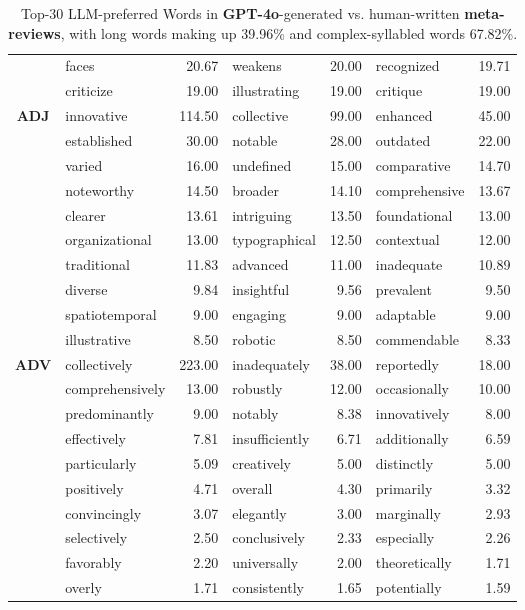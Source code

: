 \begin{table*}[t]
{\begin{tabular}{@{}c|lrlrlr@{}}
            & faces & 20.67 & weakens & 20.00 & recognized & 19.71 \\
            & criticize & 19.00 & illustrating & 19.00 & critique & 19.00 \\
            \midrule
            \multirow{10}{*}{\textbf{ADJ}} 
            & innovative & 114.50 & collective & 99.00 & enhanced & 45.00 \\
            & established & 30.00 & notable & 28.00 & outdated & 22.00 \\
            & varied & 16.00 & undefined & 15.00 & comparative & 14.70 \\
            & noteworthy & 14.50 & broader & 14.10 & comprehensive & 13.67 \\
            & clearer & 13.61 & intriguing & 13.50 & foundational & 13.00 \\
            & organizational & 13.00 & typographical & 12.50 & contextual & 12.00 \\
            & traditional & 11.83 & advanced & 11.00 & inadequate & 10.89 \\
            & diverse & 9.84 & insightful & 9.56 & prevalent & 9.50 \\
            & spatiotemporal & 9.00 & engaging & 9.00 & adaptable & 9.00 \\
            & illustrative & 8.50 & robotic & 8.50 & commendable & 8.33 \\
            \midrule
            \multirow{10}{*}{\textbf{ADV}} 
            & collectively & 223.00 & inadequately & 38.00 & reportedly & 18.00 \\
            & comprehensively & 13.00 & robustly & 12.00 & occasionally & 10.00 \\
            & predominantly & 9.00 & notably & 8.38 & innovatively & 8.00 \\
            & effectively & 7.81 & insufficiently & 6.71 & additionally & 6.59 \\
            & particularly & 5.09 & creatively & 5.00 & distinctly & 5.00 \\
            & positively & 4.71 & overall & 4.30 & primarily & 3.32 \\
            & convincingly & 3.07 & elegantly & 3.00 & marginally & 2.93 \\
            & selectively & 2.50 & conclusively & 2.33 & especially & 2.26 \\
            & favorably & 2.20 & universally & 2.00 & theoretically & 1.71 \\
            & overly & 1.71 & consistently & 1.65 & potentially & 1.59 \\
            \bottomrule
        \end{tabular}
    }
    \caption{Top-30 LLM-preferred Words in \textbf{GPT-4o}-generated vs. human-written \textbf{meta-reviews}, with long words making up 39.96\% and complex-syllabled words 67.82\%.}
    \label{tab:4m}
\end{table*}